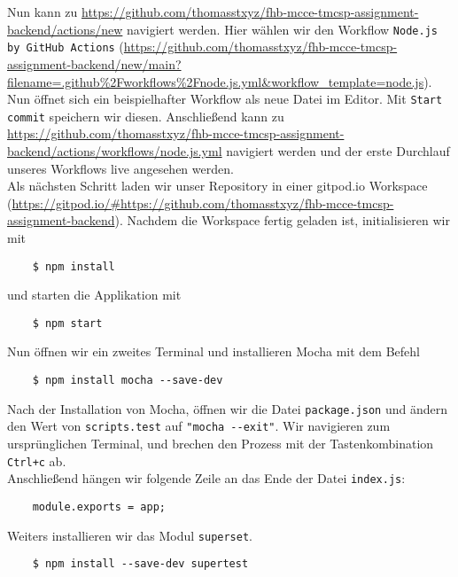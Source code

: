 \noindent
Nun kann zu \url{https://github.com/thomasstxyz/fhb-mcce-tmcsp-assignment-backend/actions/new}
navigiert werden.
Hier wählen wir den Workflow \verb|Node.js by GitHub Actions| 
(\url{https://github.com/thomasstxyz/fhb-mcce-tmcsp-assignment-backend/new/main?filename=.github%2Fworkflows%2Fnode.js.yml&workflow_template=node.js}).
Nun öffnet sich ein beispielhafter Workflow als neue Datei im Editor.
Mit \verb|Start commit| speichern wir diesen.
Anschließend kann zu \url{https://github.com/thomasstxyz/fhb-mcce-tmcsp-assignment-backend/actions/workflows/node.js.yml}
navigiert werden und der erste Durchlauf unseres Workflows live angesehen werden. \\

\noindent
Als nächsten Schritt laden wir unser Repository in einer gitpod.io Workspace
(\url{https://gitpod.io/#https://github.com/thomasstxyz/fhb-mcce-tmcsp-assignment-backend}).
Nachdem die Workspace fertig geladen ist, initialisieren wir mit 

\begin{verbatim}
	$ npm install
\end{verbatim}

\noindent
und starten die Applikation mit 
\begin{verbatim}
	$ npm start
\end{verbatim}

\noindent
Nun öffnen wir ein zweites Terminal und installieren Mocha
\cite{mochajsorgWebsite} mit dem Befehl

\begin{verbatim}
	$ npm install mocha --save-dev
\end{verbatim}

\noindent
Nach der Installation von Mocha, öffnen wir die Datei \verb|package.json|
und ändern den Wert von \verb|scripts.test| auf \verb|"mocha --exit"|.
Wir navigieren zum ursprünglichen Terminal, und brechen den Prozess mit der
Tastenkombination \verb|Ctrl+c| ab. \\

\noindent
Anschließend hängen wir folgende Zeile an das Ende der Datei \verb|index.js|:

\begin{verbatim}
	module.exports = app;
\end{verbatim}

\noindent
Weiters installieren wir das Modul \verb|superset|.

\begin{verbatim}
	$ npm install --save-dev supertest
\end{verbatim}

